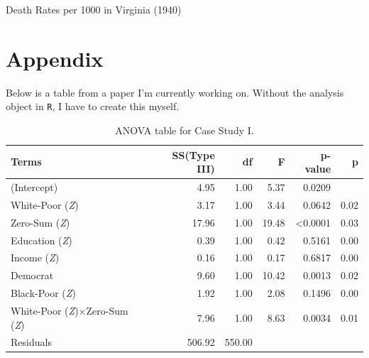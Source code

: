 \documentclass{article}\usepackage[]{graphicx}\usepackage[]{xcolor}
\begin{document}
\begin{multicols}{2}
\begin{table}[H]
\begin{center}
  \caption{Death Rates per 1000 in Virginia (1940)}
  \label{VADeaths.tab}
 \end{center}
\end{table}

\begin{tiny}

\end{tiny}
\end{multicols}

\newpage
\onecolumn
\section{Appendix}
Below is a table from a paper I'm currently working on. Without the analysis object in \texttt{R}, I have to create this myself.
\begin{table}[H]
 \begin{center}
 \begin{tabular}{lrrrrr}\\\hline
 Terms &SS(Type III) &df &F &p-value &p\\\hline
 (Intercept) &4.95 &1.00 &5.37 &0.0209 & \\
 White-Poor (\textit{Z}) &3.17 &1.00 &3.44 &0.0642  &0.02\\
 Zero-Sum (\textit{Z}) &17.96 &1.00 &19.48 &<0.0001 &0.03\\
 Education (\textit{Z}) &0.39 &1.00 &0.42 &0.5161 &0.00\\
 Income (\textit{Z}) &0.16 &1.00 &0.17 &0.6817 &0.00\\
 Democrat &9.60 &1.00 &10.42 &0.0013 &0.02\\
 Black-Poor (\textit{Z}) &1.92 &1.00 &2.08 &0.1496 &0.00\\
 White-Poor (\textit{Z})$\times$Zero-Sum (\textit{Z}) &7.96 &1.00 &8.63 &0.0034 &0.01\\
 Residuals &506.92 &550.00 & & & \\\hline
 \end{tabular} 
 \label{full.sleep.tab}
 \caption{ANOVA table for Case Study I.}
 \end{center}
 \end{table}
 
\end{document}
